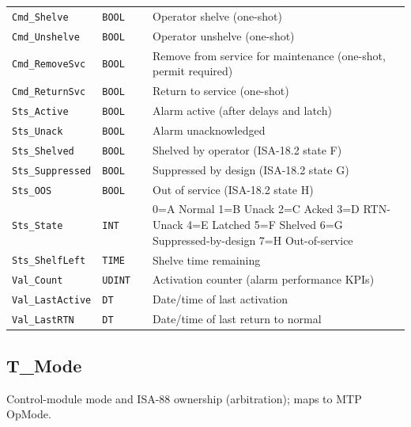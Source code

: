 \begin{small}
\begin{longtable}{@{}P{3.70cm}P{2.20cm}P{1.70cm}P{8.91cm}@{}}
\texttt{Cmd\_Shelve} & \texttt{BOOL} &  & Operator shelve (one-shot) \\
\texttt{Cmd\_Unshelve} & \texttt{BOOL} &  & Operator unshelve (one-shot) \\
\texttt{Cmd\_RemoveSvc} & \texttt{BOOL} &  & Remove from service for maintenance (one-shot, permit required) \\
\texttt{Cmd\_ReturnSvc} & \texttt{BOOL} &  & Return to service (one-shot) \\
\texttt{Sts\_Active} & \texttt{BOOL} &  & Alarm active (after delays and latch) \\
\texttt{Sts\_Unack} & \texttt{BOOL} &  & Alarm unacknowledged \\
\texttt{Sts\_Shelved} & \texttt{BOOL} &  & Shelved by operator (ISA-18.2 state F) \\
\texttt{Sts\_Suppressed} & \texttt{BOOL} &  & Suppressed by design (ISA-18.2 state G) \\
\texttt{Sts\_OOS} & \texttt{BOOL} &  & Out of service (ISA-18.2 state H) \\
\texttt{Sts\_State} & \texttt{INT} &  & 0=A Normal 1=B Unack 2=C Acked 3=D RTN-Unack 4=E Latched 5=F Shelved 6=G Suppressed-by-design 7=H Out-of-service \\
\texttt{Sts\_ShelfLeft} & \texttt{TIME} &  & Shelve time remaining \\
\texttt{Val\_Count} & \texttt{UDINT} &  & Activation counter (alarm performance KPIs) \\
\texttt{Val\_LastActive} & \texttt{DT} &  & Date/\allowbreak{}time of last activation \\
\texttt{Val\_LastRTN} & \texttt{DT} &  & Date/\allowbreak{}time of last return to normal \\
\bottomrule
\end{longtable}
\end{small}

\subsection{T\_Mode}\label{sec:pclib-t-mode}

Control-module mode and ISA-88 ownership (arbitration); maps to MTP OpMode.

\par{}\par

